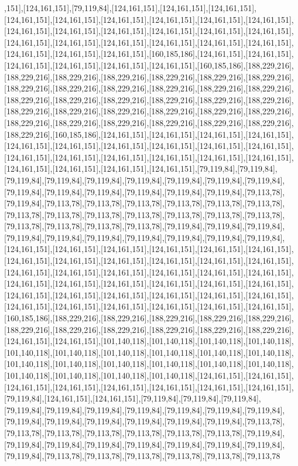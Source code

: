 ,151],[124,161,151],[79,119,84],[124,161,151],[124,161,151],[124,161,151],[124,161,151],[124,161,151],[124,161,151],[124,161,151],[124,161,151],[124,161,151],[124,161,151],[124,161,151],[124,161,151],[124,161,151],[124,161,151],[124,161,151],[124,161,151],[124,161,151],[124,161,151],[124,161,151],[124,161,151],[124,161,151],[124,161,151],[124,161,151],[124,161,151],[160,185,186],[124,161,151],[124,161,151],[124,161,151],[124,161,151],[124,161,151],[124,161,151],[160,185,186],[188,229,216],[188,229,216],[188,229,216],[188,229,216],[188,229,216],[188,229,216],[188,229,216],[188,229,216],[188,229,216],[188,229,216],[188,229,216],[188,229,216],[188,229,216],[188,229,216],[188,229,216],[188,229,216],[188,229,216],[188,229,216],[188,229,216],[188,229,216],[188,229,216],[188,229,216],[188,229,216],[188,229,216],[188,229,216],[188,229,216],[188,229,216],[188,229,216],[188,229,216],[188,229,216],[188,229,216],[188,229,216],[160,185,186],[124,161,151],[124,161,151],[124,161,151],[124,161,151],[124,161,151],[124,161,151],[124,161,151],[124,161,151],[124,161,151],[124,161,151],[124,161,151],[124,161,151],[124,161,151],[124,161,151],[124,161,151],[124,161,151],[124,161,151],[124,161,151],[124,161,151],[124,161,151],[79,119,84],[79,119,84],[79,119,84],[79,119,84],[79,119,84],[79,119,84],[79,119,84],[79,119,84],[79,119,84],[79,119,84],[79,119,84],[79,119,84],[79,119,84],[79,119,84],[79,119,84],[79,113,78],[79,119,84],[79,113,78],[79,113,78],[79,113,78],[79,113,78],[79,113,78],[79,113,78],[79,113,78],[79,113,78],[79,113,78],[79,113,78],[79,113,78],[79,113,78],[79,113,78],[79,113,78],[79,113,78],[79,113,78],[79,113,78],[79,119,84],[79,119,84],[79,119,84],[79,119,84],[79,119,84],[79,119,84],[79,119,84],[79,119,84],[79,119,84],[79,119,84],[124,161,151],[124,161,151],[124,161,151],[124,161,151],[124,161,151],[124,161,151],[124,161,151],[124,161,151],[124,161,151],[124,161,151],[124,161,151],[124,161,151],[124,161,151],[124,161,151],[124,161,151],[124,161,151],[124,161,151],[124,161,151],[124,161,151],[124,161,151],[124,161,151],[124,161,151],[124,161,151],[124,161,151],[124,161,151],[124,161,151],[124,161,151],[124,161,151],[124,161,151],[124,161,151],[124,161,151],[124,161,151],[124,161,151],[124,161,151],[124,161,151],[124,161,151],[160,185,186],[188,229,216],[188,229,216],[188,229,216],[188,229,216],[188,229,216],[188,229,216],[188,229,216],[188,229,216],[188,229,216],[188,229,216],[188,229,216],[124,161,151],[124,161,151],[101,140,118],[101,140,118],[101,140,118],[101,140,118],[101,140,118],[101,140,118],[101,140,118],[101,140,118],[101,140,118],[101,140,118],[101,140,118],[101,140,118],[101,140,118],[101,140,118],[101,140,118],[101,140,118],[101,140,118],[101,140,118],[101,140,118],[101,140,118],[124,161,151],[124,161,151],[124,161,151],[124,161,151],[124,161,151],[124,161,151],[124,161,151],[124,161,151],[79,119,84],[124,161,151],[124,161,151],[79,119,84],[79,119,84],[79,119,84],[79,119,84],[79,119,84],[79,119,84],[79,119,84],[79,119,84],[79,119,84],[79,119,84],[79,119,84],[79,119,84],[79,119,84],[79,119,84],[79,119,84],[79,119,84],[79,113,78],[79,113,78],[79,113,78],[79,113,78],[79,113,78],[79,113,78],[79,113,78],[79,119,84],[79,119,84],[79,119,84],[79,119,84],[79,119,84],[79,119,84],[79,119,84],[79,119,84],[79,119,84],[79,113,78],[79,113,78],[79,113,78],[79,113,78],[79,113,78],[79,113,78